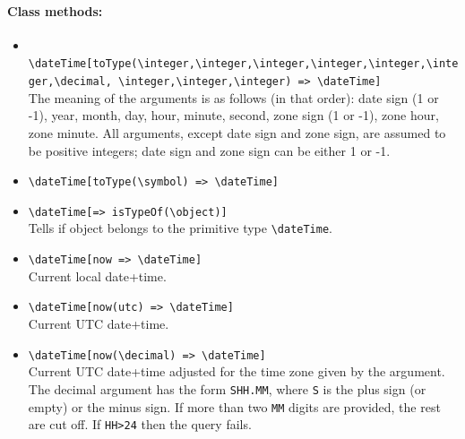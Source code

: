 \documentclass[11pt]{article}
\newcommand{\bs}{\textbackslash}
\begin{document}
\paragraph{Class methods:}
\begin{itemize}
\item {\tt
    \bs{}dateTime[toType(\bs{}integer,\bs{}integer,\bs{}integer,\bs{}integer,\bs{}integer,\bs{}integer,\bs{}decimal,
    \bs{}integer,\bs{}integer,\bs{}integer)
    => \bs{}dateTime]} \\
  The meaning of the arguments is as follows (in that order): date sign (1
  or -1), year, month, day, hour, minute, second, zone sign (1 or -1), zone
  hour, zone minute.  All arguments, except date sign and zone sign, are
  assumed to be positive integers; date sign and zone sign can be
  either 1 or -1.
\item {\tt \bs{}dateTime[toType(\bs{}symbol) => \bs{}dateTime]}  
\item {\tt \bs{}dateTime[=> isTypeOf(\bs{}object)]}  \\
  Tells if object belongs to the primitive type {\tt \bs{}dateTime}.
\item \texttt{\bs{}dateTime[now => \bs{}dateTime]} \\
  Current local date+time.
\item \texttt{\bs{}dateTime[now(utc) => \bs{}dateTime]} \\
  Current UTC date+time.
\item \texttt{\bs{}dateTime[now(\bs{}decimal) => \bs{}dateTime]} \\
  Current UTC date+time adjusted for the time zone given by the
  argument.
  The decimal argument has the form \texttt{SHH.MM}, where \texttt{S} is
  the plus sign (or empty) or the minus sign.
  If more than two \texttt{MM} digits are provided, the rest are cut off.
  If \texttt{HH>24} then the query fails. 
\end{itemize}
\end{document}
